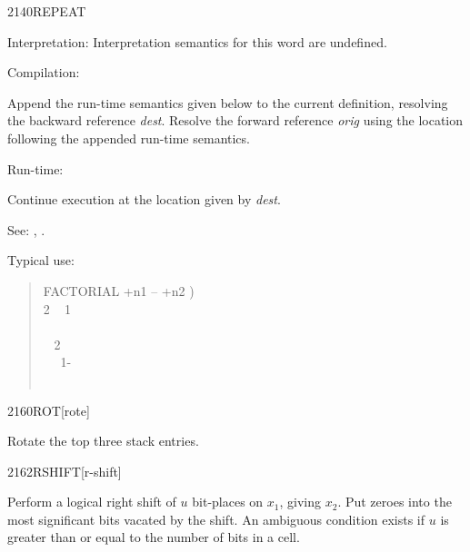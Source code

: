\begin{newword*}{2140}{REPEAT}
\item[Interpretation:]
	Interpretation semantics for this word are undefined.

\item[Compilation:]

	Append the run-time semantics given below to the current
	definition, resolving the backward reference \emph{dest}.
	Resolve the forward reference \emph{orig} using the location
	following the appended run-time semantics.

\item[Run-time:]
	\stack{}{}

	Continue execution at the location given by \emph{dest}.

\item[See:]
	,
	.

	\begin{rationale} %
		Typical use:
		\begin{quote}\ttfamily
			\word{:} FACTORIAL  +n1 -- +n2 ) \\
			\tab {} 2  ~
				 1 ~  \\
			\tab {} \\
			\tab {}~  2   \\
			\tab~~ 1- ~  \word{*}~  \\
			\tab {}  \\
			\word{;}
		\end{quote}
	\end{rationale}
\end{newword*}


\begin{newword}{2160}{ROT}[rote]

	Rotate the top three stack entries.
\end{newword}


\begin{newword}{2162}{RSHIFT}[r-shift]

	Perform a logical right shift of $u$ bit-places on $x_1$, giving
	$x_2$. Put zeroes into the most significant bits vacated by the
	shift. An ambiguous condition exists if $u$ is greater than or
	equal to the number of bits in a cell.
\end{newword}


